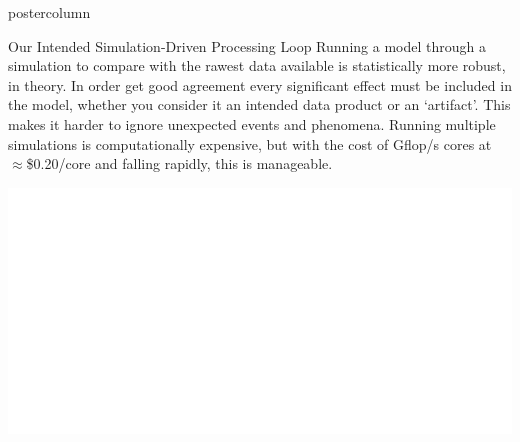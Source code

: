 \documentclass[final,hyperref={pdfpagelabels=false}]{beamer}
\begin{document}
\begin{frame}
\begin{columns}
\begin{column}{.49\textwidth}
\begin{beamercolorbox}[center,wd=\textwidth]{postercolumn}
\begin{minipage}[T]{.95\textwidth}
{            \vspace{2cm}
            \begin{block}{Our Intended Simulation-Driven Processing Loop}
            Running a model through a simulation to compare with the rawest data available is statistically more robust, in theory. In order get good agreement every significant effect must be included in the model, whether you consider it an intended data product or an `artifact'. This makes it harder to ignore unexpected events and phenomena. Running multiple simulations is computationally expensive, but with the cost of Gflop/s cores at  $\approx$\$0.20/core and falling rapidly, this is manageable.
              \begin{center}
              \includegraphics[width=0.75\linewidth]{figures/Our_Pipeline.pdf}
              \end{center}
            \end{block}
          }
        \end{minipage}
      \end{beamercolorbox}
    \end{column}


\end{columns}
\end{frame}
\end{document}
